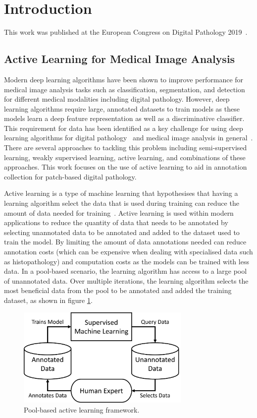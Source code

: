 \section{Introduction}
This work was published at the European Congress on Digital Pathology 2019~\citep{carse2019active}.

\subsection{Active Learning for Medical Image Analysis}
Modern deep learning algorithms have been shown to improve performance for medical image analysis tasks such as classification, segmentation, and detection for different medical modalities including digital pathology. However, deep learning algorithms require large, annotated datasets to train models as these models learn a deep feature representation as well as a discriminative classifier. This requirement for data has been identified as a key challenge for using deep learning algorithms for digital pathology~\citep{tizhoosh2018artificial} and medical image analysis in general~\citep{litjens2017survey}. There are several approaches to tackling this problem including semi-supervised learning, weakly supervised learning, active learning, and combinations of these approaches. This work focuses on the use of active learning to aid in annotation collection for patch-based digital pathology.

Active learning is a type of machine learning that hypothesises that having a learning algorithm select the data that is used during training can reduce the amount of data needed for training~\citep{settles2012active}. Active learning is used within modern applications to reduce the quantity of data that needs to be annotated by selecting unannotated data to be annotated and added to the dataset used to train the model. By limiting the amount of data annotations needed can reduce annotation costs (which can be expensive when dealing with specialised data such as histopathology) and computation costs as the models can be trained with less data. In a pool-based scenario, the learning algorithm has access to a large pool of unannotated data. Over multiple iterations, the learning algorithm selects the most beneficial data from the pool to be annotated and added the training dataset, as shown in figure \ref{fig:pool_based_active_learning}.

\begin{figure}[h]
	\centering
	\includegraphics[width=0.75\textwidth]{images/active_learning.png}
	\caption{Pool-based active learning framework.}
	\label{fig:pool_based_active_learning}
\end{figure}

